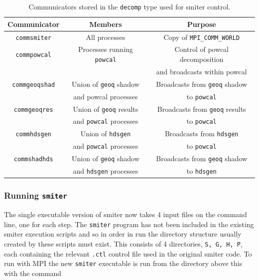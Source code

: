 \begin{table}
  \begin{center}
    \begin{tabular}{ | c | c | c | }
      \hline
      Communicator  &  Members & Purpose \\
      \hline
      {\tt commsmiter}   & All processes & Copy of {\tt MPI\_COMM\_WORLD} \\ \hline
      {\tt commpowcal}   & Processes running {\tt powcal} & Control of powcal decomposition   \\ 
                         &                                & and broadcasts within powcal      \\ \hline
      {\tt commgeoqshad} & Union of {\tt geoq} shadow     & Broadcasts from {\tt geoq} shadow \\
                         & and powcal processes           & to {\tt powcal}                   \\ \hline
      {\tt commgeoqres}  & Union of {\tt geoq} results    & Broadcasts from {\tt geoq} results \\
                         & and {\tt powcal} processes     & to {\tt powcal}                   \\ \hline
      {\tt commhdsgen}   & Union of {\tt hdsgen}          & Broadcasts from {\tt hdsgen}    \\
                         & and {\tt powcal} processes     & to {\tt powcal}   \\ \hline
      {\tt commshadhds}  & Union of {\tt geoq} shadow     & Broadcasts from {\tt geoq} shadow \\
                         & and {\tt hdsgen} processes     & to {\tt hdsgen} \\
      \hline
    \end{tabular}
    \caption{Communicators stored in the {\tt decomp} type used for smiter control.\label{tab:comms}}
  \end{center}
\end{table}

\subsubsection{Running {\tt smiter}}
\label{loc:runningSmiter}
The single executable version of smiter now takes 4 input files on the command line, one for each step. The {\tt smiter} program has not been included in the existing smiter execution scripts and so in order in run the directory structure usually created by these scripts must exist. This consists of 4 directories, {\tt S, G, H, P}, each containing the relevant {\tt .ctl} control file used in the original smiter code. To run with MPI the new {\tt smiter} executable is run from the directory above this with the command

